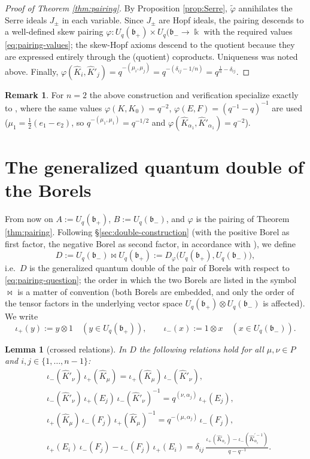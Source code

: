 \documentclass[11pt]{amsart}
\newtheorem{lemma}[theorem]{Lemma}
\theoremstyle{definition}
\newtheorem{remark}[theorem]{Remark}
\newcommand{\BK}{\Bbbk}
\newcommand{\fb}{\mathfrak{b}}
\newcommand{\iop}{\iota_{+}}
\newcommand{\iom}{\iota_{-}}
\newcommand{\hK}{\hat K}
\newcommand{\al}{\alpha}
\begin{document}
\begin{proof}[Proof of Theorem \ref{thm:pairing}]
By Proposition \ref{prop:Serre}, $\widetilde\varphi$ annihilates the Serre
ideals $J_\pm$ in each variable. Since $J_\pm$ are Hopf ideals, the pairing
descends to a well-defined skew pairing
$\varphi:U_q(\fb_+)\times U_q(\fb_-\to\BK$ with the required values
\eqref{eq:pairing-values}; the skew-Hopf axioms descend to the quotient because
they are expressed entirely through the (quotient) coproducts. Uniqueness was
noted above. Finally,
$\varphi(\hK_i,\hK'_j)=q^{-(\mu_i,\mu_j)}=q^{-(\delta_{ij}-1/n)}
=q^{\frac1n-\delta_{ij}}$.
\end{proof}

\begin{remark}
For $n=2$ the above construction and verification specialize exactly to
\cite[Lem.~2.8--2.9]{UvA}, where the same values
$\varphi(K,K_0)=q^{-2}$, $\varphi(E,F)=(q^{-1}-q)^{-1}$ are used
($\mu_1=\frac12(e_1-e_2)$, so $q^{-(\mu_1,\mu_1)}=q^{-1/2}$ and
$\varphi(\hK_{\al_1},\hK'_{\al_1})=q^{-2}$).
\end{remark}

\section{The generalized quantum double of the Borels}\label{sec:double}

From now on $A:=U_q(\fb_+)$, $B:=U_q(\fb_-)$, and $\varphi$ is the pairing of
Theorem \ref{thm:pairing}. Following \S\ref{sec:double-construction} (with the
positive Borel as first factor, the negative Borel as second factor, in
accordance with \cite[\S1--2]{UvA}), we define
\[
D:=U_q(\fb_-)\bowtie U_q(\fb_+):=D_\varphi\big(U_q(\fb_+),U_q(\fb_-)\big),
\]
i.e.\ $D$ is the generalized quantum double of the pair of Borels with respect
to \eqref{eq:pairing-question}; the order in which the two Borels are listed in
the symbol $\bowtie$ is a matter of convention (both Borels are embedded, and
only the order of the tensor factors in the underlying vector space
$U_q(\fb_+)\otimes U_q(\fb_-)$ is affected). We write
\[
\iop(y):=y\otimes1\quad(y\in U_q(\fb_+)),\qquad
\iom(x):=1\otimes x\quad(x\in U_q(\fb_-)).
\]

\begin{lemma}[crossed relations]\label{lem:cross}
In $D$ the following relations hold for all $\mu,\nu\in P$ and
$i,j\in\{1,\dots,n-1\}$:
\begin{align}
&\iom(\hK'_\nu)\,\iop(\hK_\mu)=\iop(\hK_\mu)\,\iom(\hK'_\nu),\label{eq:D1}\\
&\iom(\hK'_\nu)\,\iop(E_j)\,\iom(\hK'_\nu)^{-1}
=q^{(\nu,\al_j)}\,\iop(E_j),\label{eq:D2}\\
&\iop(\hK_\mu)\,\iom(F_j)\,\iop(\hK_\mu)^{-1}
=q^{-(\mu,\al_j)}\,\iom(F_j),\label{eq:D3}\\
&\iop(E_i)\,\iom(F_j)-\iom(F_j)\,\iop(E_i)
=\delta_{ij}\,\frac{\iop(\hK_{\al_i})-\iom(\hK_{\al_i}^{\prime-1})}{q-q^{-1}}.
\label{eq:D4}
\end{align}
\end{lemma}
\end{document}
